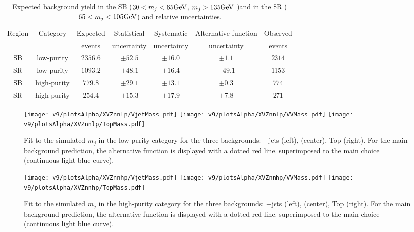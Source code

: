 \begin{table}[!htb]
  \begin{center}
    \begin{tabular}{cc|c|ccc|c}
      Region & Category   & Expected & Statistical       & Systematic     & Alternative function& Observed \\
       &  & events & uncertainty       & uncertainty     & uncertainty & events\\
      \hline
      \hline
      SB     & low-purity & $2356.6$ & $\pm 52.5$ & $\pm 16.0$ & $\pm 1.1$    & $2314$ \\
      SR     & low-purity & $1093.2$  & $\pm 48.1$ & $\pm 16.4$ & $\pm 49.1$   & $1153$ \\
      \hline
      SB & high-purity    & $779.8$  & $\pm 29.1$ & $\pm 13.1$ & $\pm 0.3$  & $774$ \\
      SR & high-purity    & $254.4$  & $\pm 15.3$ & $\pm 17.9$ & $\pm 7.8$  & $271$ \\
    \end{tabular}
  \end{center}
  \caption{Expected background yield in the SB ($30 < m_j < 65\text{GeV}$, $m_j > 135\text{GeV}$ )and in the SR ($65 < m_j < 105\text{GeV}$) and relative uncertainties.}\label{tab:BkgNorm}
\end{table}




\begin{figure}[!htb]
  \centering
    \texttt{[image: v9/plotsAlpha/XVZnnlp/VjetMass.pdf]}
    \texttt{[image: v9/plotsAlpha/XVZnnlp/VVMass.pdf]}
    \texttt{[image: v9/plotsAlpha/XVZnnlp/TopMass.pdf]}
  \caption{Fit to the simulated $m_j$ in the low-purity category for the three backgrounds: \V+jets (left), \V\V (center), Top (right). For the main background prediction, the alternative function is displayed with a dotted red line, superimposed to the main choice (continuous light blue curve).}
  \label{fig:XVZnnlp_JetMass}
\end{figure}


\begin{figure}[!htb]
  \centering
    \texttt{[image: v9/plotsAlpha/XVZnnhp/VjetMass.pdf]}
    \texttt{[image: v9/plotsAlpha/XVZnnhp/VVMass.pdf]}
    \texttt{[image: v9/plotsAlpha/XVZnnhp/TopMass.pdf]}
  \caption{Fit to the simulated $m_j$ in the high-purity category for the three backgrounds: \V+jets (left), \V\V (center), Top (right). For the main background prediction, the alternative function is displayed with a dotted red line, superimposed to the main choice (continuous light blue curve).}
  \label{fig:XVZnnhp_JetMass}
\end{figure}


